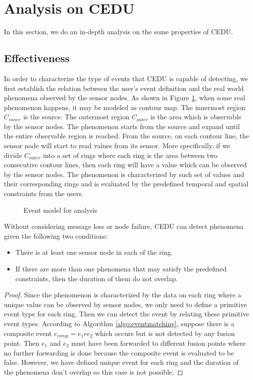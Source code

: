 \section{Analysis on CEDU}
\label{sec:ceduanalysis}
In this section, we do an in-depth analysis on the some properties of CEDU.
\subsection{Effectiveness}
In order to characterize the type of events that CEDU is capable of detecting, we first establish the relation between the user's event definition and the real world phenomena observed by the sensor nodes. As shown in Figure \ref{fig:eventContour}, when some real phenomenon happens, it may be modeled as contour map. The innermost region \(C_{inner}\) is the source. The outermost region \(C_{outer}\) is the area which is observable by the sensor nodes. The phenomenon starts from the source and expand until the entire observable region is reached. From the source, on each contour line, the sensor node will start to read values from its sensor. More specifically, if we divide \(C_{outer}\) into a set of rings where each ring is the area between two consecutive contour lines, then each ring will have a value which can be observed by the sensor nodes. The phenomenon is characterized by such set of values and their corresponding rings and is evaluated by the predefined temporal and spatial constraints from the users.

\begin{figure}
\centering
{}
\caption{Event model for analysis}
\label{fig:eventContour}
\end{figure}

\begin{theorem}
\label{thm:ceducorrectness}
Without considering message loss or node failure, CEDU can detect phenomena given the following two conditions:
\begin{itemize}
\item There is at least one sensor node in each of the ring.
\item If there are more than one phenomena that may satisfy the predefined constraints, then the duration of them do not overlap.
\end{itemize}
\end{theorem}

\begin{proof}
Since the phenomenon is characterized by the data on each ring where a unique value can be observed by sensor nodes, we only need to define a primitive event type for each ring. Then we can detect the event by relating these primitive event types. According to Algorithm \ref{algo:eventmatching}, suppose there is a composite event \(e_{comp}=e_1re_2\) which occurs but is not detected by any fusion point. Then \(e_1\) and \(e_2\) must have been forwarded to different fusion points where no further forwarding is done because the composite event is evaluated to be false. However, we have defined unique event for each ring and the duration of the phenomena don't overlap so this case is not possible.
\end{proof}

